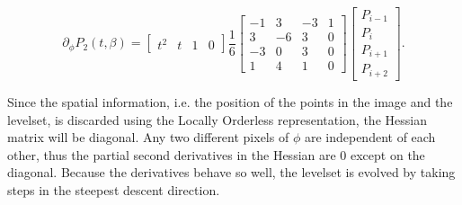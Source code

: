 \begin{equation}
\partial_\phi  P_2(t,\beta) = 
  \begin{bmatrix} t^2 & t & 1 & 0 \end{bmatrix} 
  \frac{1}{6} 
  \begin{bmatrix}
    -1 &  3 & -3 & 1 \\
    3 & -6 &  3 & 0 \\
    -3 &  0 &  3 & 0 \\
    1 &  4 &  1 & 0 
  \end{bmatrix}
  \left[\begin{array}{l} 
      P_{i-1} \\
      P_{i} \\
      P_{i+1} \\
      P_{i+2}
    \end{array}\right].
\end{equation}

Since the spatial information, i.e. the position of the points in the image and the levelset, is discarded using the Locally Orderless representation, the Hessian matrix will be diagonal. Any two different pixels of $\phi$ are independent of each other, thus the partial second derivatives in the Hessian are 0 except on the diagonal. Because the derivatives behave so well, the levelset is evolved by taking steps in the steepest descent direction.